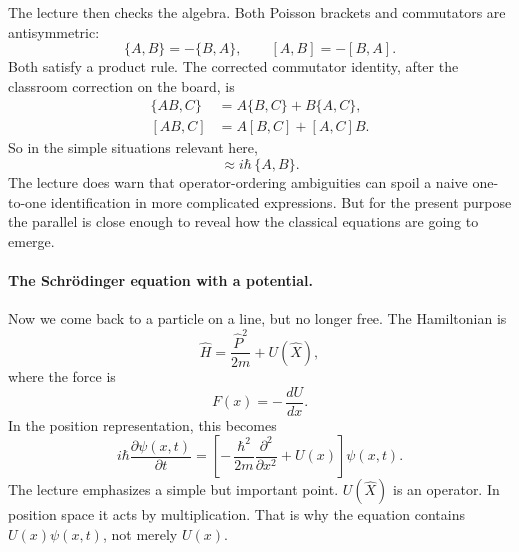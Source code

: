 The lecture then checks the algebra. Both Poisson brackets and commutators are antisymmetric:
\begin{equation}
\{A,B\}=-\{B,A\},
\qquad
[A,B]=-[B,A].
\end{equation}
Both satisfy a product rule. The corrected commutator identity, after the classroom correction on the board, is
\begin{align}
\{AB,C\} &= A\{B,C\}+B\{A,C\}, \\
[AB,C] &= A[B,C]+[A,C]B.
\end{align}
So in the simple situations relevant here,
\begin{equation}
[A,B]\approx i\hbar\,\{A,B\}.
\end{equation}
The lecture does warn that operator-ordering ambiguities can spoil a naive one-to-one identification in more complicated expressions. But for the present purpose the parallel is close enough to reveal how the classical equations are going to emerge.

\paragraph{The Schr\"odinger equation with a potential.}
Now we come back to a particle on a line, but no longer free. The Hamiltonian is
\begin{equation}
\hat H=\frac{\hat P^2}{2m}+U(\hat X),
\end{equation}
where the force is
\begin{equation}
F(x)=-\,\frac{dU}{dx}.
\end{equation}
In the position representation, this becomes
\begin{equation}
i\hbar \frac{\partial \psi(x,t)}{\partial t}
=
\left[
-\,\frac{\hbar^2}{2m}\frac{\partial^2}{\partial x^2}
+
U(x)
\right]\psi(x,t).
\end{equation}
The lecture emphasizes a simple but important point. \(U(\hat X)\) is an operator. In position space it acts by multiplication. That is why the equation contains \(U(x)\psi(x,t)\), not merely \(U(x)\).

